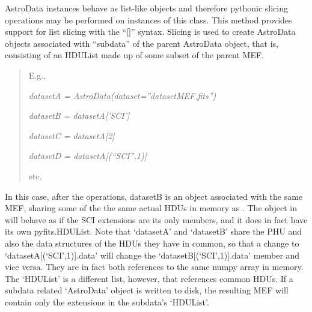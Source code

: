 \documentclass[letterpaper,10pt,english]{sphinxmanual}
\begin{document}
\begin{fulllineitems}
\begin{quote}
\begin{description}
\begin{itemize}
\end{itemize}

\end{description}\end{quote}

\begin{fulllineitems}
\label{astro_class:astrodata.AstroData.AstroData.__getitem__}
AstroData instances behave as list-like objects and therefore pythonic
slicing operations may be performed on instances of this class.
This method provides support for list slicing with the ``{[}{]}'' syntax.
Slicing is used to create AstroData objects associated with ``subdata'' 
of the parent AstroData object, that is, consisting of
an HDUList made up of some subset of the parent MEF.
\begin{quote}

E.g.,

\emph{datasetA = AstroData(dataset=''datasetMEF.fits'')}

\emph{datasetB = datasetA{[}'SCI'{]}}

\emph{datasetC = datasetA{[}2{]}}

\emph{datasetD = datasetA{[}(``SCI'',1){]}}

etc.
\end{quote}

In this case, after the operations, datasetB is an  object
associated with the same MEF, sharing some of the the same actual HDUs
in memory as . The object in  will behave as if
the SCI extensions are its only members, and it does in fact have its 
own pyfits.HDUList. Note that `datasetA' and `datasetB' share the 
PHU and also the data structures of the HDUs they have in common, so 
that a change to `datasetA{[}(`SCI',1){]}.data' will change the 
`datasetB{[}(`SCI',1){]}.data' member and vice versa. They are in fact both
references to the same numpy array in memory. The `HDUList' is a 
different list, however, that references common HDUs. If a subdata 
related `AstroData' object is written to disk, the resulting MEF will
contain only the extensions in the subdata's `HDUList'.


\end{fulllineitems}
\end{fulllineitems}
\end{document}

